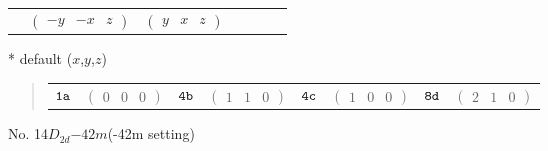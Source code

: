 \documentclass[fleqn,9pt,landscape]{jsarticle}
\begin{document}
\begin{center}
\begin{longtable}{ccccccc}
& $ \begin{pmatrix} - y & - x & z \end{pmatrix} $ & $ \begin{pmatrix} y & x & z \end{pmatrix} $ & $  $ & $  $ & $  $ & $  $ \\
\end{longtable}
\end{center}
* default ($x$,$y$,$z$)
\begin{quote}
\begin{tabular}{cccccccc}
$ {\tt 1a} $ & $ \begin{pmatrix} 0 & 0 & 0 \end{pmatrix} $ & $ {\tt 4b} $ & $ \begin{pmatrix} 1 & 1 & 0 \end{pmatrix} $ & $ {\tt 4c} $ & $ \begin{pmatrix} 1 & 0 & 0 \end{pmatrix} $ & $ {\tt 8d} $ & $ \begin{pmatrix} 2 & 1 & 0 \end{pmatrix} $
\end{tabular}
\end{quote}
\newpage
No. 14\quad$D_{2d}$\quad$-42m$\quad(-42m setting)\quad[ tetragonal ]
\end{document}
